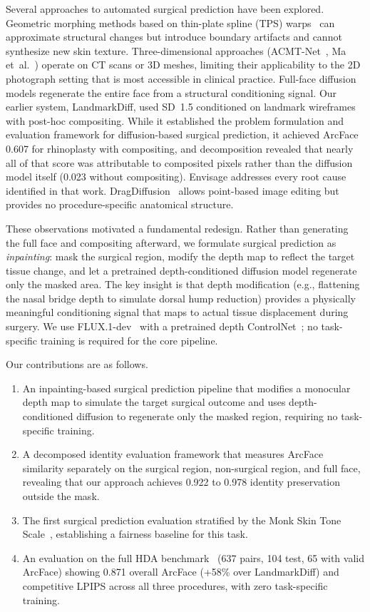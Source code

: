 \documentclass[twocolumn]{article}
\newcommand{\method}{Envisage}
\begin{document}
Several approaches to automated surgical prediction have been explored.
Geometric morphing methods based on thin-plate spline (TPS)
warps~\cite{bookstein1989tps} can approximate structural changes but
introduce boundary artifacts and cannot synthesize new skin texture.
Three-dimensional approaches (ACMT-Net~\cite{li2023acmt},
Ma et~al.~\cite{ma2023gposc}) operate on CT scans or 3D meshes,
limiting their applicability to the 2D photograph setting that is
most accessible in clinical practice. Full-face diffusion models
regenerate the entire face from a structural conditioning signal.
Our earlier system, LandmarkDiff, used SD~1.5 conditioned on landmark
wireframes with post-hoc compositing. While it established the problem
formulation and evaluation framework for diffusion-based surgical
prediction, it achieved ArcFace 0.607 for rhinoplasty with compositing, and
decomposition revealed that nearly all of that score was attributable to
composited pixels rather than the diffusion model itself (0.023 without
compositing). \method{} addresses every root cause identified in that
work.
DragDiffusion~\cite{shi2024dragdiffusion} allows point-based image
editing but provides no procedure-specific anatomical structure.

These observations motivated a fundamental redesign. Rather than
generating the full face and compositing afterward, we formulate
surgical prediction as \emph{inpainting}: mask the surgical region,
modify the depth map to reflect the target tissue change, and let a
pretrained depth-conditioned diffusion model regenerate only the masked
area. The key insight is that depth modification (e.g., flattening the
nasal bridge depth to simulate dorsal hump reduction) provides a
physically meaningful conditioning signal that maps to actual tissue
displacement during surgery. We use FLUX.1-dev~\cite{flux2024} with a
pretrained depth ControlNet~\cite{zhang2023controlnet}; no
task-specific training is required for the core pipeline.

Our contributions are as follows.
\begin{enumerate}
\item An inpainting-based surgical prediction pipeline that modifies a
monocular depth map to simulate the target surgical outcome and uses
depth-conditioned diffusion to regenerate only the masked region,
requiring no task-specific training.
\item A decomposed identity evaluation framework that measures ArcFace
similarity separately on the surgical region, non-surgical region, and
full face, revealing that our approach achieves 0.922 to 0.978 identity
preservation outside the mask.
\item The first surgical prediction evaluation stratified by the Monk
Skin Tone Scale~\cite{monk2023monk}, establishing a fairness baseline
for this task.
\item An evaluation on the full HDA benchmark~\cite{rathgeb2020plastic}
(637 pairs, 104 test, 65 with valid ArcFace) showing 0.871 overall ArcFace (+58\%
over LandmarkDiff) and competitive LPIPS across all three procedures,
with zero task-specific training.
\end{enumerate}
\end{document}
